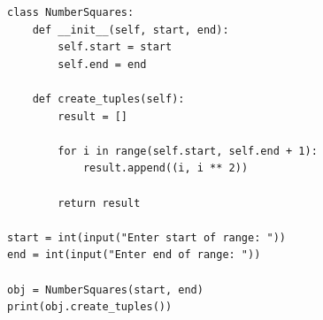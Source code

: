 \begin{verbatim}
class NumberSquares:
    def __init__(self, start, end):
        self.start = start
        self.end = end

    def create_tuples(self):
        result = []

        for i in range(self.start, self.end + 1):
            result.append((i, i ** 2))

        return result

start = int(input("Enter start of range: "))
end = int(input("Enter end of range: "))

obj = NumberSquares(start, end)
print(obj.create_tuples())
\end{verbatim}
